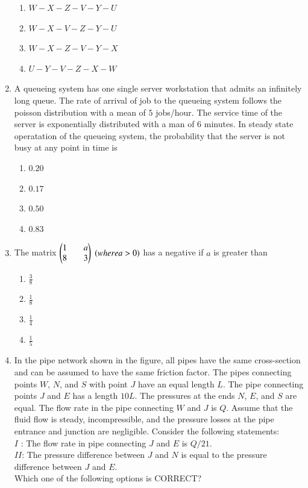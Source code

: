 \documentclass[journal]{IEEEtran}
\begin{document}
\begin{enumerate}
\begin{enumerate}
    \item$W-X-Z-V-Y-U$\\
    \item$W-X-V-Z-Y-U$\\
    \item$W-X-Z-V-Y-X$\\
    \item$U-Y-V-Z-X-W$\\
\end{enumerate}
\item A queueing system has one single server workstation that admits an infinitely long queue. The rate of arrival of job to the queueing system follows the poisson distribution with a mean of $5$ jobs/hour. The service time of the server is exponentially distributed with a man of $6$ minutes. In steady state operatation of the queueing system, the probability that the server is not busy at any point in time is\\
\begin{enumerate}
    \item$0.20$\\
    \item$0.17$\\
    \item$0.50$\\
    \item$0.83$\\
\end{enumerate}
\item The matrix $\begin{pmatrix}1 && a\\ 8 && 3\end{pmatrix}$ $\left(where a > 0\right)$ has a negative if $a$ is greater than\\
\begin{enumerate}
    \item$\frac{3}{8}$\\
     \item$\frac{1}{8}$\\
      \item$\frac{1}{4}$\\
       \item$\frac{1}{5}$\\
\end{enumerate}
\item In the pipe network shown in the figure, all pipes have the same cross-section and
can be assumed to have the same friction factor. The pipes connecting points $W$, $N$,
and $S$ with point $J$ have an equal length $L$. The pipe connecting points $J$ and $E$ has a
length $10L$. The pressures at the ends $N$, $E$, and $S$ are equal. The flow rate in the pipe
connecting $W$ and $J$ is $Q$. Assume that the fluid flow is steady, incompressible, and
the pressure losses at the pipe entrance and junction are negligible. Consider the
following statements:\\
$I$ : The flow rate in pipe connecting $J$ and $E$ is $Q/21$.\\
$II$: The pressure difference between $J$ and $N$ is equal to the pressure difference
between $J$ and $E$.\\
Which one of the following options is CORRECT?\\


\end{enumerate}
\end{document}
